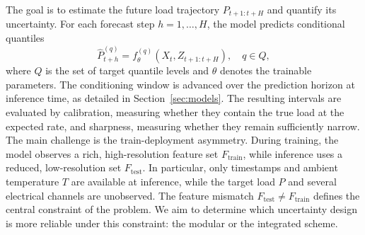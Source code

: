 \documentclass[final,10pt,1p,authoryear]{elsarticle}
\theoremstyle{definition}
\begin{document}
The goal is to estimate the future load trajectory $P_{t+1:t+H}$ and quantify its uncertainty. For each forecast step $h=1,\ldots,H$, the model predicts conditional quantiles
\begin{equation}
\widehat{P}^{(q)}_{t+h}=f_{\theta}^{(q)}\!\left(X_t,Z_{t+1:t+H}\right),\quad q\in{Q},
\label{eq:quantile_forecast}
\end{equation}
where ${Q}$ is the set of target quantile levels and $\theta$ denotes the trainable parameters. The conditioning window is advanced over the prediction horizon at inference time, as detailed in Section~\ref{sec:models}. The resulting intervals are evaluated by calibration, measuring whether they contain the true load at the expected rate, and sharpness, measuring whether they remain sufficiently narrow. The main challenge is the train-deployment asymmetry. During training, the model observes a rich, high-resolution feature set $F_{\text{train}}$, while inference uses a reduced, low-resolution set $F_{\text{test}}$. In particular, only timestamps and ambient temperature $T$ are available at inference, while the target load $P$ and several electrical channels are unobserved. The feature mismatch $F_{\text{test}}\neq F_{\text{train}}$ defines the central constraint of the problem. We aim to determine which uncertainty design is more reliable under this constraint: the modular or the integrated scheme.
\end{document}
